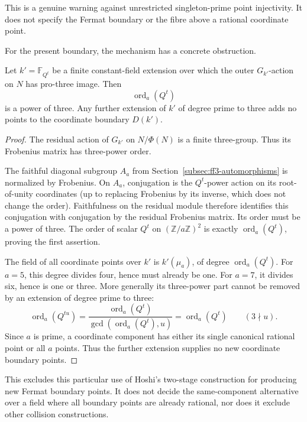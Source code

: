 This is a genuine warning against unrestricted singleton-prime point injectivity. It does not specify the Fermat boundary or the fibre above a rational coordinate point.

For the present boundary, the mechanism has a concrete obstruction.

\begin{proposition}
\label{prop:ff3-hoshi-boundary}

Let \(k'=\mathbb F_{Q^t}\) be a finite constant-field extension over which the outer \(G_{k'}\)-action on \(N\) has pro-three image. Then \[
 \operatorname{ord}_a(Q^t)
\] is a power of three. Any further extension of \(k'\) of degree prime to three adds no points to the coordinate boundary \(D(k')\).

\end{proposition}
\begin{proof}

The residual action of \(G_{k'}\) on \(N/\Phi(N)\) is a finite three-group. Thus its Frobenius matrix has three-power order.

The faithful diagonal subgroup \(A_a\) from Section~\ref{subsec:ff3-automorphisms} is normalized by Frobenius. On \(A_a\), conjugation is the \(Q^t\)-power action on its root-of-unity coordinates (up to replacing Frobenius by its inverse, which does not change the order). Faithfulness on the residual module therefore identifies this conjugation with conjugation by the residual Frobenius matrix. Its order must be a power of three. The order of scalar \(Q^t\) on \((\mathbb Z/a\mathbb Z)^2\) is exactly \(\operatorname{ord}_a(Q^t)\), proving the first assertion.

The field of all coordinate points over \(k'\) is \(k'(\mu_a)\), of degree \(\operatorname{ord}_a(Q^t)\). For \(a=5\), this degree divides four, hence must already be one. For \(a=7\), it divides six, hence is one or three. More generally its three-power part cannot be removed by an extension of degree prime to three: \[
 \operatorname{ord}_a(Q^{tu})
 =\frac{\operatorname{ord}_a(Q^t)}
        {\gcd(\operatorname{ord}_a(Q^t),u)}
 =\operatorname{ord}_a(Q^t)
 \qquad(3\nmid u).
\] Since \(a\) is prime, a coordinate component has either its single canonical rational point or all \(a\) points. Thus the further extension supplies no new coordinate boundary points.

\end{proof}

This excludes this particular use of Hoshi's two-stage construction for producing new Fermat boundary points. It does not decide the same-component alternative over a field where all boundary points are already rational, nor does it exclude other collision constructions.

